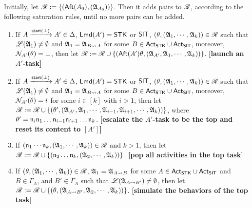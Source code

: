 Initially, let $\mathscr{R} := \{({\sf Aft}(A_0),({\mathfrak{A} }_{A_0}))\}$.
Then it adds pairs to $\mathscr{R}$, according to the following saturation rules, until no more pairs can be added. 

\smallskip
\fbox
{
\begin{minipage}{0.9\textwidth}
\begin{enumerate}
    \item If $A \xrightarrow{{\mathsf{start} }(\bot)}A' \in\Delta$, ${\sf Lmd}(A')=\mathsf{STK}$ or ${\sf SIT}$, $(\theta, ({\mathfrak{A} }_1,\cdots,{\mathfrak{A} }_k)) \in \mathscr{R}$ such that ${\mathscr{L} }({\mathfrak{A} }_1) \neq \emptyset$ and ${\mathfrak{A} }_1 = {\mathfrak{A} }_{B\rightsquigarrow A}$ for some $B \in {\sf Act}_{\sf STK}\cup{\sf Act}_{\sf SIT}$, moreover, $\mathcal{N}_{A'}(\theta) = \bot$,
    then let $\mathscr{R}: = \mathscr{R} \cup \{({\sf Aft}(A')\theta, ({\mathfrak{A} }_{A'},{\mathfrak{A} }_1,\cdots,{\mathfrak{A} }_k))\}$.
        \textbf{[launch an $A'$-task]}

    \item If $A \xrightarrow{{\mathsf{start} }(\bot)}A' \in\Delta$, ${\sf Lmd}(A')=\mathsf{STK}$ or ${\sf SIT}$, $(\theta, ({\mathfrak{A} }_1,\cdots,{\mathfrak{A} }_k)) \in \mathscr{R}$ such that ${\mathscr{L} }({\mathfrak{A} }_1) \neq \emptyset$ and ${\mathfrak{A} }_1 = {\mathfrak{A} }_{B\rightsquigarrow A}$ for some $B \in {\sf Act}_{\sf STK}\cup{\sf Act}_{\sf SIT}$, moreover, $\mathcal{N}_{A'}(\theta) = i$ for some $i \in [k]$ with $i > 1$, 
        then let $\mathscr{R}:= \mathscr{R} \cup \{(\theta', ({\mathfrak{A} }_{A'}, {\mathfrak{A} }_1, \cdots,{\mathfrak{A} }_{i-1},{\mathfrak{A} }_{i+1},\cdots,{\mathfrak{A} }_{k}))\}$, where $\theta' = \mathfrak{n}_i\mathfrak{n}_1\dots\mathfrak{n}_{i-1}\mathfrak{n}_{i+1}\dots\mathfrak{n}_k$. 
        \textbf{[escalate the $A'$-task to be the top and reset its content to $[A']$]}
    \item If $(\mathfrak{n}_1 \cdots \mathfrak{n}_k, ({\mathfrak{A} }_1,\cdots,{\mathfrak{A} }_k)) \in \mathscr{R}$ and $k>1$, then let $\mathscr{R} := \mathscr{R} \cup \{(\mathfrak{n}_2\dots\mathfrak{n}_k, ({\mathfrak{A} }_2,\cdots,{\mathfrak{A} }_k))\}$.
        \textbf{[pop all activities in the top task]}
%
    \item If $(\theta, ({\mathfrak{A} }_1,\cdots,{\mathfrak{A} }_k)) \in \mathscr{R}$, ${\mathfrak{A} }_1 = {\mathfrak{A} }_{A\rightsquigarrow B}$ for some $A\in{\sf Act}_{\mathsf{STK}}\cup{\sf Act}_{\mathsf{SIT}}$ and $B \in \Gamma_A$, and $B'  \in \Gamma_A$ such that ${\mathscr{L} }({\mathfrak{A} }_{A\rightsquigarrow B'}) \neq \emptyset$, then let 
    $\mathscr{R} := \mathscr{R} \cup \{(\theta, ({\mathfrak{A} }_{A\rightsquigarrow B'}, {\mathfrak{A} }_2,\cdots,{\mathfrak{A} }_k))\}$. 
        \textbf{[simulate the behaviors of the top task]}
\end{enumerate}
\end{minipage}
}

